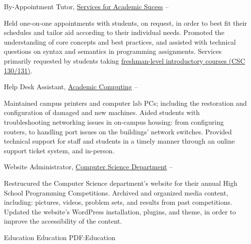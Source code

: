 \documentclass[letterpaper,MMMyyyy,nonstopmode]{simpleresumecv}
\begin{document}
\begin{Body}
\Gap
\BulletItem
By-Appointment Tutor,
\href{https://www.rocky.edu/student-life/student-support/academic-support/ServicesAcademicSuccess.php}
{Services for Academic Sucess}
\hfill
{} --
\begin{Detail}
\SubBulletItem
Held one-on-one appointments with students, on request, in order to best fit their schedules and tailor aid according to their individual needs.
\SubBulletItem
Promoted the understanding of core concepts and best practices, and assisted with technical questions on syntax and semantics in programming assignments.
\SubBulletItem
Services primarily requested by students taking \href{https://www.rocky.edu/academics/catalog/program/9/Computer_Science#courses-content}{freshman-level introductory courses (CSC 130/131)}.
\end{Detail}

\Gap
\BulletItem
Help Desk Assistant,
\href{https://rocky.edu/student-life/student-support/academic-computing/}
{Academic Computing}
\hfill
{} --
\begin{Detail}
\SubBulletItem
Maintained campus printers and computer lab PCs; including the restoration and configuration of damaged and new machines.
\SubBulletItem
Aided students with troubleshooting networking issues in on-campus housing: from configuring routers, to handling port issues on the buildings' network switches.
\SubBulletItem
Provided technical support for staff and students in a timely manner through an online support ticket system, and in-person.
\end{Detail}

\Gap
\BulletItem
Website Administrator,
\href{http://cs.rocky.edu/programming-competitions/high-school-competions/}
{Computer Science Department}
\hfill
{} --
\begin{Detail}
\SubBulletItem
Restrucured the Computer Science department's website for their annual High School Programming Competitions.
\SubBulletItem
Archived and organized media content, including: pictures, videos, problem sets, and results from past competitions.
\SubBulletItem
Updated the website's WordPress installation, plugins, and theme, in order to improve the accessibility of the content.
\end{Detail}


\Section
{Education}
{Education}
{PDF:Education}


\end{Body}
\end{document}
